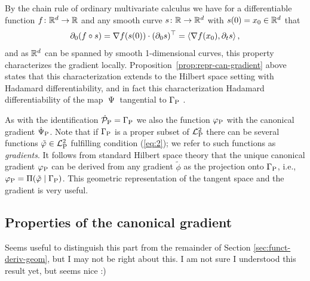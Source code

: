 \documentclass[a4,danish]{article}
\DeclareMathOperator{\TT}{\Psi}
\newcommand{\lp}{\mathcal{L}_{\P}^2} %
\begin{document}
By the chain rule of ordinary multivariate calculus we have for a differentiable function
$f\colon\R^d \rightarrow \R$ and any smooth curve $s\colon\R\rightarrow \R^d$ with
$s(0) = x_0 \in \R^d$ that
\begin{equation*}
  \partial_{0} (f\circ s) = \nabla f(s(0)) \cdot (\partial_{0}s )^{\T}
  =
  \left\langle
    \nabla f(x_0) ,  \partial_{t}s 
  \right\rangle,
\end{equation*}
and as $\R^d$ can be spanned by smooth 1-dimensional curves, this property characterizes the
gradient locally. Proposition~\ref{prop:repr-can-gradient} above states that this characterization
extends to the Hilbert space setting with Hadamard differentiability, and in fact this
characterization  Hadamard differentiability
of the map $\TT$ tangential to $\Gamma_{\P}$ \citep[A.5]{bickel1993efficient}.

As with the identification $\dot{\mathcal{P}}_{\P}= \Gamma_{\P}$ we
also  the function $\phi_{\P}$ with the canonical
gradient $\dot{\Psi}_{\P}$. Note that if $\Gamma_{\P}$ is a proper
subset of $\lp$ there can be several functions $\tilde{\phi} \in \lp$
fulfilling condition (\ref{eq:2}); we refer to such functions as
\textit{gradients}. It follows from standard Hilbert space theory that
the unique canonical gradient $\phi_{\P}$ can be derived from any
gradient $\tilde{\phi}$ as the projection onto $\Gamma_{\P}$, i.e.,
$ \phi_{\P} = \Pi(\tilde{\phi} \mid \Gamma_{\P})$. This geometric
representation of the tangent space and the gradient is very useful.

\subsection{Properties of the canonical gradient}



Seems useful to distinguish this part from the remainder of Section
\ref{sec:funct-deriv-geom}, but I may not be right about this. I am
not sure I understood this result yet, but seems nice :)

\end{document}

